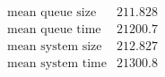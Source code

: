 \[\begin{array}{cc}
 \text{mean queue size} & 211.828 \\
 \text{mean queue time} & 21200.7 \\
 \text{mean system size} & 212.827 \\
 \text{mean system time} & 21300.8 \\
\end{array}\]

